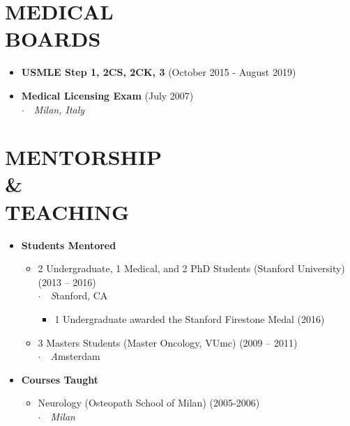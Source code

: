 \documentclass[line,margin]{res}
\newcommand{\titlestyle}[1]{{\bf #1}}
\newcommand{\placestyle}[1]{\footnotesize $\cdot$\ \ {\emph{#1}}}
\newcommand{\datestyle}[1]{{\tiny \dotfill} {\small (#1)}}
\begin{document}
\begin{resume}
\section{MEDICAL \\ BOARDS}
\begin{itemize}
\item {
  \titlestyle {USMLE Step 1, 2CS, 2CK, 3} \datestyle{October 2015 - August 2019}
}
\item {
  \titlestyle {Medical Licensing Exam} \datestyle{July 2007} \\
  { \placestyle{Milan, Italy} }
}
\end{itemize}

\section{MENTORSHIP \\ \& \\ TEACHING}
\begin{itemize}
  \item {
    {\bf Students Mentored}
    \begin{itemize}
      \item 2 Undergraduate, 1 Medical, and 2 PhD Students (Stanford University) \datestyle{2013 -- 2016} \\
        {\placestyle Stanford, CA}
        \begin{itemize}
          \item 1 Undergraduate awarded the Stanford Firestone Medal \datestyle{2016}
        \end{itemize}
      \item 3 Masters Students (Master Oncology, VUmc)  \datestyle{2009 -- 2011} \\
        {\placestyle Amsterdam}
    \end{itemize}
  }
  \item {
    {\bf Courses Taught}
    \begin{itemize}
      \item Neurology (Osteopath School of Milan) \datestyle{2005-2006} \\
        {\placestyle{Milan}}
    \end{itemize}
  }

\end{itemize}

\newpage

\end{resume}
\end{document}
